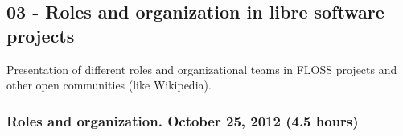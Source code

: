 \documentclass[a4paper]{article}
\begin{document}
% 
% 
% 
% 
% 
\subsection{03 - Roles and organization in libre software projects}

Presentation of different roles and organizational teams in FLOSS projects and other open communities (like Wikipedia).

\subsubsection{Roles and organization. October 25, 2012 (4.5 hours)}
\end{document}
